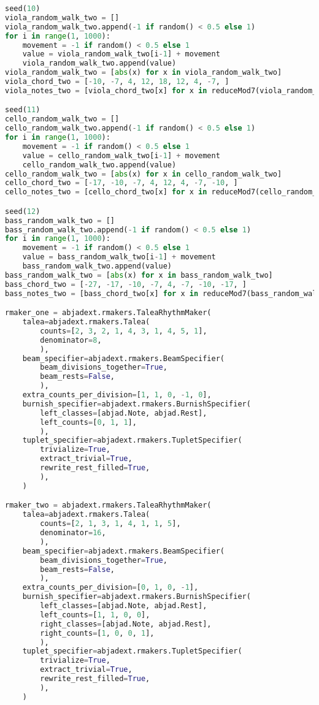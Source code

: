 \begin{lstlisting}[language=Python, caption=Tianshu Segment\_IV]
seed(10)
viola_random_walk_two = []
viola_random_walk_two.append(-1 if random() < 0.5 else 1)
for i in range(1, 1000):
    movement = -1 if random() < 0.5 else 1
    value = viola_random_walk_two[i-1] + movement
    viola_random_walk_two.append(value)
viola_random_walk_two = [abs(x) for x in viola_random_walk_two]
viola_chord_two = [-10, -7, 4, 12, 18, 12, 4, -7, ]
viola_notes_two = [viola_chord_two[x] for x in reduceMod7(viola_random_walk_two)]

seed(11)
cello_random_walk_two = []
cello_random_walk_two.append(-1 if random() < 0.5 else 1)
for i in range(1, 1000):
    movement = -1 if random() < 0.5 else 1
    value = cello_random_walk_two[i-1] + movement
    cello_random_walk_two.append(value)
cello_random_walk_two = [abs(x) for x in cello_random_walk_two]
cello_chord_two = [-17, -10, -7, 4, 12, 4, -7, -10, ]
cello_notes_two = [cello_chord_two[x] for x in reduceMod7(cello_random_walk_two)]

seed(12)
bass_random_walk_two = []
bass_random_walk_two.append(-1 if random() < 0.5 else 1)
for i in range(1, 1000):
    movement = -1 if random() < 0.5 else 1
    value = bass_random_walk_two[i-1] + movement
    bass_random_walk_two.append(value)
bass_random_walk_two = [abs(x) for x in bass_random_walk_two]
bass_chord_two = [-27, -17, -10, -7, 4, -7, -10, -17, ]
bass_notes_two = [bass_chord_two[x] for x in reduceMod7(bass_random_walk_two)]

rmaker_one = abjadext.rmakers.TaleaRhythmMaker(
    talea=abjadext.rmakers.Talea(
        counts=[2, 3, 2, 1, 4, 3, 1, 4, 5, 1],
        denominator=8,
        ),
    beam_specifier=abjadext.rmakers.BeamSpecifier(
        beam_divisions_together=True,
        beam_rests=False,
        ),
    extra_counts_per_division=[1, 1, 0, -1, 0],
    burnish_specifier=abjadext.rmakers.BurnishSpecifier(
        left_classes=[abjad.Note, abjad.Rest],
        left_counts=[0, 1, 1],
        ),
    tuplet_specifier=abjadext.rmakers.TupletSpecifier(
        trivialize=True,
        extract_trivial=True,
        rewrite_rest_filled=True,
        ),
    )

rmaker_two = abjadext.rmakers.TaleaRhythmMaker(
    talea=abjadext.rmakers.Talea(
        counts=[2, 1, 3, 1, 4, 1, 1, 5],
        denominator=16,
        ),
    beam_specifier=abjadext.rmakers.BeamSpecifier(
        beam_divisions_together=True,
        beam_rests=False,
        ),
    extra_counts_per_division=[0, 1, 0, -1],
    burnish_specifier=abjadext.rmakers.BurnishSpecifier(
        left_classes=[abjad.Note, abjad.Rest],
        left_counts=[1, 1, 0, 0],
        right_classes=[abjad.Note, abjad.Rest],
        right_counts=[1, 0, 0, 1],
        ),
    tuplet_specifier=abjadext.rmakers.TupletSpecifier(
        trivialize=True,
        extract_trivial=True,
        rewrite_rest_filled=True,
        ),
    )


\end{lstlisting}
